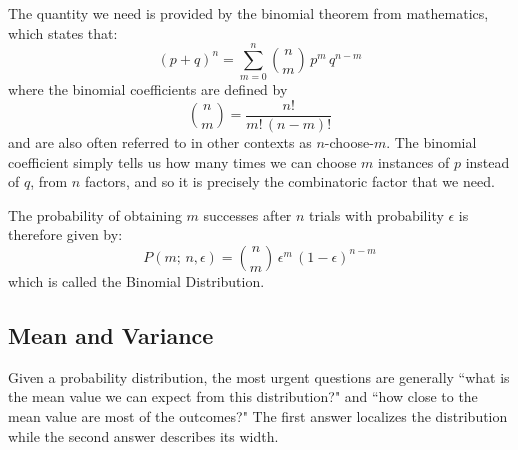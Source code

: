 \documentclass[12pt]{article}
\begin{document}
The quantity we need is provided by the binomial theorem from mathematics, which states that:
\begin{equation}
\label{eqn:binomt}
(p+q)^n = \sum_{m=0}^{n} \binom{n}{m} \, p^m \, q^{n-m}
\end{equation}
where the binomial coefficients are defined by
\begin{equation}
\label{eqn:binomc}
\binom{n}{m} = \frac{n!}{m! \, (n-m)!}
\end{equation}
and are also often referred to in other contexts as $n$-choose-$m$.  The binomial coefficient simply tells us how many times we can choose $m$ instances of $p$ instead of $q$, from $n$ factors, and so it is precisely the combinatoric factor that we need.

The probability of obtaining $m$ successes after $n$ trials with probability $\epsilon$ is therefore given by:
\begin{equation}
\label{eqn:binom}
P(m; \, n ,\epsilon) = \binom{n}{m} \, \epsilon^m \, (1 - \epsilon)^{n-m}
\end{equation}
which is called the Binomial Distribution.

\subsection{Mean and Variance}

Given a probability distribution, the most urgent questions are generally ``what is the mean value we can expect from this distribution?" and ``how close to the mean value are most of the outcomes?"  The first answer localizes the distribution while the second answer describes its width.
\end{document}
